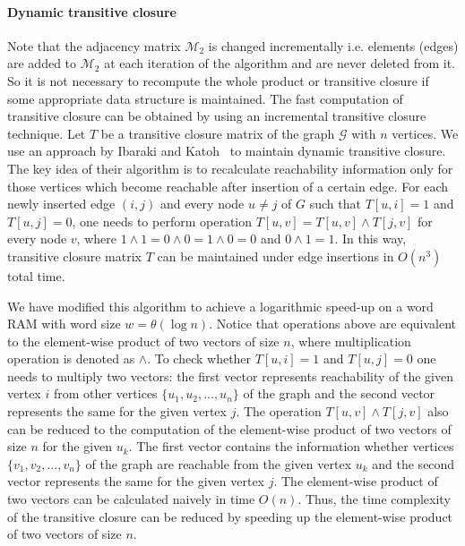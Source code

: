 \paragraph*{Dynamic transitive closure}
Note that the adjacency matrix $\mathcal{M}_2$ is changed incrementally i.e. elements (edges) are added to $\mathcal{M}_2$ at each iteration of the algorithm and are never deleted from it.
So it is not necessary to recompute the whole product or transitive closure if some appropriate data structure is maintained.
The fast computation of transitive closure can be obtained by using an incremental transitive closure technique.
Let $T$ be a transitive closure matrix of the graph $\mathcal{G}$ with $n$ vertices.
We use an approach by Ibaraki and Katoh~\cite{IBARAKI198395} to maintain dynamic transitive closure.
The key idea of their algorithm is to recalculate reachability information only for those vertices which become reachable after insertion of a certain edge. For each newly inserted edge $(i, j)$ and every node $u \neq j$ of $G$ such that $T[u, i] = 1$ and $T[u, j]=0$, one needs to perform operation $T[u,v] = T[u, v] \wedge T[j, v]$ for every node $v$, where $1 \wedge 1 = 0 \wedge 0 = 1 \wedge 0 = 0$ and $0 \wedge 1 = 1$. In this way, transitive closure matrix $T$ can be maintained under edge insertions in $O(n^3)$ total time. 

We have modified this algorithm to achieve a logarithmic speed-up on a word RAM with word size $w= \theta(\log n)$. Notice that operations above are equivalent to the element-wise product of two vectors of size $n$, where multiplication operation is denoted as $\wedge$. To check whether $T[u, i] = 1$ and $T[u, j]=0$ one needs to multiply two vectors: the first vector represents reachability of the given vertex $i$ from other vertices $\{u_1, u_2, ..., u_n\}$ of the graph and the second vector represents the same for the given vertex $j$. The operation $T[u, v] \wedge T[j, v]$ also can be reduced to the computation of the element-wise product of two vectors of size $n$ for the given $u_k$. The first vector contains the information whether vertices  $\{v_1, v_2, ..., v_n\}$ of the graph are reachable from the given vertex $u_k$ and the second vector represents the same for the given vertex $j$. The element-wise product of two vectors can be calculated naively in time $O(n)$. Thus, the time complexity of the transitive closure can be reduced by speeding up the element-wise product of two vectors of size $n$.


